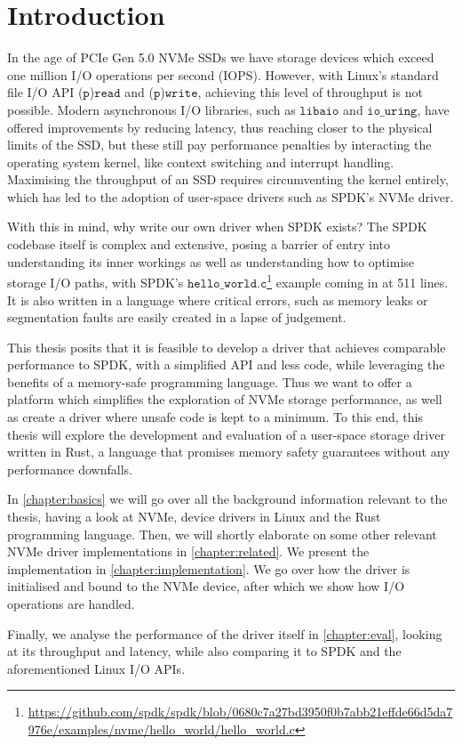\chapter{Introduction}\label{chapter:introduction}
In the age of PCIe Gen 5.0 NVMe SSDs we have storage devices which exceed one million I/O operations per second (IOPS). However, with Linux's standard file I/O API ($\texttt{p}$)$\texttt{read}$ and ($\texttt{p}$)$\texttt{write}$, achieving this level of throughput is not possible. Modern asynchronous I/O libraries, such as $\texttt{libaio}$ and $\texttt{io\_uring}$, have offered improvements by reducing latency, thus reaching closer to the physical limits of the SSD, but these still pay performance penalties by interacting the operating system kernel, like context switching and interrupt handling\cite{storage_api}. Maximising the throughput of an SSD requires circumventing the kernel entirely, which has led to the adoption of user-space drivers such as SPDK's NVMe driver.

With this in mind, why write our own driver when SPDK exists? The SPDK codebase itself is complex and extensive, posing a barrier of entry into understanding its inner workings as well as understanding how to optimise storage I/O paths, with SPDK's $\texttt{hello\_world.c}$\footnote{\url{https://github.com/spdk/spdk/blob/0680c7a27bd3950f0b7abb21effde66d5da7976e/examples/nvme/hello_world/hello_world.c}} example coming in at 511 lines. It is also written in a language where critical errors, such as memory leaks or segmentation faults are easily created in a lapse of judgement.

This thesis posits that it is feasible to develop a driver that achieves comparable performance to SPDK, with a simplified API and less code, while leveraging the benefits of a memory-safe programming language. Thus we want to offer a platform which simplifies the exploration of NVMe storage performance, as well as create a driver where unsafe code is kept to a minimum. To this end, this thesis will explore the development and evaluation of a user-space storage driver written in Rust, a language that promises memory safety guarantees without any performance downfalls.

In \autoref{chapter:basics} we will go over all the background information relevant to the thesis, having a look at NVMe, device drivers in Linux and the Rust programming language. Then, we will shortly elaborate on some other relevant NVMe driver implementations in \autoref{chapter:related}.
We present the implementation in \autoref{chapter:implementation}. We go over how the driver is initialised and bound to the NVMe device, after which we show how I/O operations are handled.

Finally, we analyse the performance of the driver itself in \autoref{chapter:eval}, looking at its throughput and latency, while also comparing it to SPDK and the aforementioned Linux I/O APIs.
